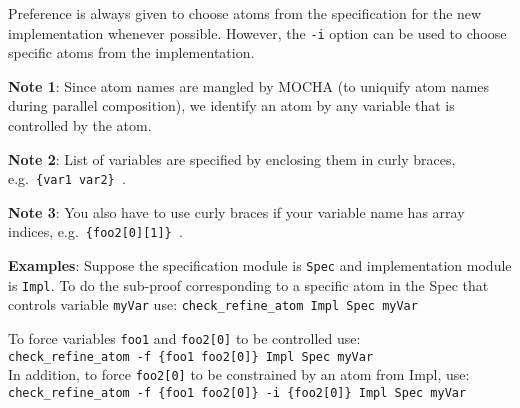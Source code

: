\mypar
Preference is always given to choose atoms from the specification for the new
implementation whenever possible. However, the {\tt -i} option can be used to
choose specific atoms from the implementation.  

\mypar
{\bf Note 1}: Since atom names are mangled by MOCHA (to uniquify atom
names during parallel composition), we identify an atom by any variable that is
controlled by the atom.

\mypar
{\bf Note 2}: List of variables are specified by enclosing them in curly braces,
e.g.~{\tt \{var1 var2\} }.

\mypar
{\bf Note 3}: You also have to use curly braces if your variable name has array
indices, e.g.~{\tt \{foo2[0][1]\} }.

\mypar
{\bf Examples}:
Suppose the specification module is {\tt Spec} and implementation module is
{\tt Impl}. To do the sub-proof corresponding to a specific atom in the Spec that
controls variable {\tt myVar} use: {\tt check\_refine\_atom Impl Spec myVar} 

\mypar
To force variables {\tt foo1} and {\tt foo2[0]} to be controlled use: \\
{\tt check\_refine\_atom -f \{foo1 foo2[0]\} Impl Spec myVar} \\

\mypar
In addition, to force {\tt foo2[0]} to be constrained by an atom from Impl, use:\\
{\tt check\_refine\_atom -f \{foo1 foo2[0]\} -i \{foo2[0]\} Impl Spec myVar}

